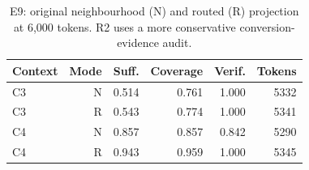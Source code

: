 \begin{table}[t]
\centering\footnotesize
\caption{E9: original neighbourhood (N) and routed (R) projection at 6,000 tokens. R2 uses a more conservative conversion-evidence audit.}
\label{tab:archive-routing}
\setlength{\tabcolsep}{3.5pt}
\begin{tabular}{@{}lrrrrr@{}}
\toprule
Context & Mode & Suff. & Coverage & Verif. & Tokens \\
\midrule
C3 & N & 0.514 & 0.761 & 1.000 & 5332 \\
C3 & R & 0.543 & 0.774 & 1.000 & 5341 \\
C4 & N & 0.857 & 0.857 & 0.842 & 5290 \\
C4 & R & 0.943 & 0.959 & 1.000 & 5345 \\
\bottomrule
\end{tabular}
\end{table}
